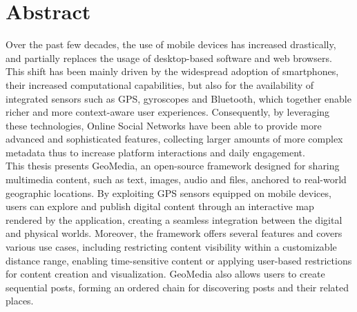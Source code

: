 \cleardoublepage
{}
{}
\begingroup
\let\clearpage\relax
\let\cleardoublepage\relax
\let\cleardoublepage\relax

\chapter*{Abstract}


Over the past few decades, the use of mobile devices has increased drastically, and partially replaces the usage of desktop-based software and web browsers. This shift has been mainly driven by the widespread adoption of smartphones, their increased computational capabilities, but also for the availability of integrated sensors such as GPS, gyroscopes and Bluetooth, which together enable richer and more context-aware user experiences. Consequently, by leveraging these technologies, Online Social Networks have been able to provide more advanced and sophisticated features, collecting larger amounts of more complex metadata thus to increase platform interactions and daily engagement.\\
This thesis presents GeoMedia, an open-source framework designed for sharing multimedia content, such as text, images, audio and files, anchored to real-world geographic locations. By exploiting GPS sensors equipped on mobile devices, users can explore and publish digital content through an interactive map rendered by the application, creating a seamless integration between the digital and physical worlds. Moreover, the framework offers several features and covers various use cases, including restricting content visibility within a customizable distance range, enabling time-sensitive content or applying user-based restrictions for content creation and visualization. GeoMedia also allows users to create sequential posts, forming an ordered chain for discovering posts and their related places. \\





\endgroup

\vfill

